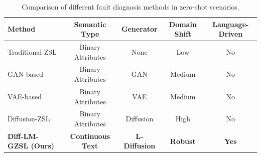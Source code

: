 \begin{table}[htbp]
\caption{Comparison of different fault diagnosis methods in zero-shot scenarios.}
\label{tab:comparison}
\centering
\begin{tabular}{lcccc}
\hline
Method & Semantic Type & Generator & Domain Shift & Language-Driven \\ \hline
Traditional ZSL \cite{Wang2021a} & Binary Attributes & None & Low & No \\
GAN-based \cite{Yan2021} & Binary Attributes & GAN & Medium & No \\
VAE-based \cite{Xu2021} & Binary Attributes & VAE & Medium & No \\
Diffusion-ZSL \cite{Mao2024} & Binary Attributes & Diffusion & High & No \\
\textbf{Diff-LM-GZSL (Ours)} & \textbf{Continuous Text} & \textbf{L-Diffusion} & \textbf{Robust} & \textbf{Yes} \\ \hline
\end{tabular}
\end{table}
